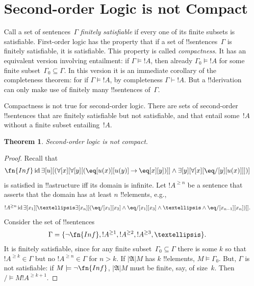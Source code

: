 \documentclass[10pt,a4paper]{article}
\theoremstyle{plain}
\newtheorem{thm}{Theorem}[section]
\theoremstyle{definition}
\theoremstyle{remark}
\newenvironment{explain}{}{}
\newcommand*{\olfileid}[3]{}
\newcommand*{\olsection}[1]{\section*{#1}}
\newcommand*{\ollabel}[1]{\label{#1}}
\providecommand{\lif}{\mathbin{\rightarrow}}
\providecommand{\lforall}{\mathord{\forall}}
\providecommand{\lexists}{\mathord{\exists}}
\providecommand{\Proves}{\mathrel{\vdash}}
\providecommand{\Entails}{\mathrel{\models}}
\providecommand{\Domain}{\ensuremath{|\mathfrak{A}|}}
\providecommand{\Sat}[2]{\ensuremath{#1 \models #2}}
\providecommand{\ident}{\operatorname{id}}
\begin{document}



\olfileid{sol}{met}{com}

\olsection{Second-order Logic is not Compact}

\begin{explain}
Call a set of sentences~$\Gamma$ \emph{finitely satisfiable} if every
one of its finite subsets is satisfiable.  First-order logic has the
property that if a set of !!{sentence}s~$\Gamma$ is finitely
satisfiable, it is satisfiable.  This property is called
\emph{compactness}.  It has an equivalent version involving
entailment: if $\Gamma \Entails !A$, then already $\Gamma_0 \Entails
!A$ for some finite subset~$\Gamma_0 \subseteq \Gamma$. In this
version it is an immediate corollary of the completeness theorem: for
if $\Gamma \Entails !A$, by completeness $\Gamma \Proves !A$. But a
!!{derivation} can only make use of finitely many !!{sentence}s
of~$\Gamma$.

Compactness is not true for second-order logic. There are sets of
second-order !!{sentence}s that are finitely satisfiable but not
satisfiable, and that entail some~$!A$ without a finite subset
entailing~$!A$.  
\end{explain}


\begin{thm}
\ollabel{thm:sol-undecidable}
Second-order logic is not compact.
\end{thm}

\begin{proof}
Recall that 
\[
\fn{Inf} \ident \lexists[u][(\lforall[x][\lforall[y][(\eq[u(x)][u(y)]
      \lif \eq[x][y])]] \land \lexists[y][\lforall[x][\eq/[y][u(x)]]])]
\]
is satisfied in !!a{structure} iff its domain is infinite. Let
$!A^{\ge n}$ be a sentence that asserts that the domain has at least
$n$ !!{element}s, e.g.,
\[
!A^{\ge n} \ident \lexists[x_1][\dots\lexists[x_n][(\eq/[x_1][x_2]
    \land \eq/[x_1][x_3] \land \dots \land \eq/[x_{n-1}][x_n])]].
\]
Consider the set of !!{sentence}s
\[
\Gamma = \{\lnot \fn{Inf}, !A^{\ge 1}, !A^{\ge 2}, !A^{\ge 3}, \dots\}.
\]
It is finitely satisfiable, since for any finite subset~$\Gamma_0
\subseteq \Gamma$
there is some $k$ so that $!A^{\ge k} \in \Gamma$ but no $!A^{\ge n}
\in \Gamma$ for $n>k$. If $\Domain{M}$ has $k$ !!{element}s,
$\Sat{M}{\Gamma_0}$. But, $\Gamma$ is not satisfiable: if
$\Sat{M}{\lnot \fn{Inf}}$, $\Domain{M}$ must be finite, say, of
size~$k$. Then $\Sat/{M}{!A^{\ge k+1}}$.
\end{proof}
\end{document}
